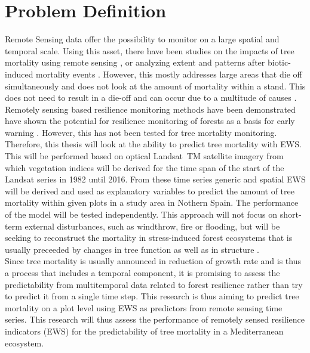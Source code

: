 \section{Problem Definition}\label{sec:problem}
Remote Sensing data offer the possibility to monitor on a large spatial and temporal scale. Using this asset, there have been studies on the impacts of tree mortality using remote sensing \citep[e.g.][]{breshears2005, meigs2011}, or analyzing extent and patterns after biotic-induced mortality events \citep[e.g.][]{meddens2012, wulder2006}. However, this mostly addresses large areas that die off simultaneously and does not look at the amount of mortality within a stand. This does not need to result in a die-off and can occur due to a multitude of causes \citep{cailleret2017, gessler2017, hartmann2015, mcdowell2011a, mcdowell2013, seidl2011}. Remotely sensing based resilience monitoring methods have been demonstrated have shown the potential for resilience monitoring of forests as a basis for early warning \citep{keersmaecker2014, verbesselt2016}. However, this has not been tested for tree mortality monitoring.\\
Therefore, this thesis will look at the ability to predict tree mortality with EWS. This will be performed based on optical Landsat~TM satellite imagery from which vegetation indices will be derived for the time span of the start of the Landsat series in 1982 until 2016. From these time series generic and spatial EWS will be derived and used as explanatory variables to predict the amount of tree mortality within given plots in a study area in Nothern Spain. The performance of the model will be tested independently. This approach will not focus on short-term external disturbances, such as windthrow, fire or flooding, but will be seeking to reconstruct the mortality in stress-induced forest ecosystems that is usually preceeded by changes in tree function as well as in structure \citep{hartmann2015}.\\
Since tree mortality is usually announced in reduction of growth rate and is thus a process that includes a temporal component, it is promising to assess the predictability from multitemporal data related to forest resilience rather than try to predict it from a single time step. This research is thus aiming to predict tree mortality on a plot level using EWS as predictors from remote sensing time series. This research will thus assess the performance of remotely sensed resilience indicators (EWS) for the predictability of tree mortality in a Mediterranean ecosystem.\\